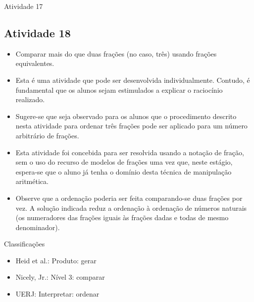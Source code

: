 \begin{multicols}{2}
\begin{resposta*}{Atividade 17}
\end{resposta*}



\subsection{Atividade 18}
  
\begin{itemize} %
    \item       Comparar mais do que duas frações (no caso, três) usando frações 
equivalentes.
\end{itemize} %
  
  
 
\begin{itemize} %
    \item       Esta é uma atividade que pode ser desenvolvida individualmente. 
Contudo, é fundamental que os alunos sejam estimulados a explicar o raciocínio 
realizado.
    \item       Sugere-se que seja observado para os alunos que o procedimento 
descrito nesta atividade para ordenar três frações pode ser aplicado para um 
número arbitrário de frações.
    \item       Esta atividade foi concebida para ser resolvida usando a notação 
de fração, sem o uso do recurso de modelos de frações uma vez que, neste 
estágio, espera-se que o aluno já tenha o domínio desta técnica de manipulação 
aritmética.
    \item       Observe que a ordenação poderia ser feita comparando-se duas 
frações por vez. A solução indicada reduz a ordenação à ordenação de números 
naturais (os numeradores das frações iguais às frações dadas e todas de mesmo 
denominador).
\end{itemize} %
  
  
  Classificações  
\begin{itemize} %
    \item       Heid et al.: Produto: gerar
    \item       Nicely, Jr.: Nível 3: comparar
    \item       UERJ: Interpretar: ordenar
\end{itemize} %
  

\end{multicols}
